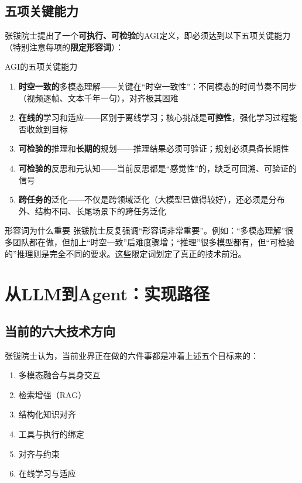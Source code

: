 \documentclass[a4paper]{article}
\begin{document}
\subsection{五项关键能力}

张钹院士提出了一个\textbf{可执行、可检验}的AGI定义，即必须达到以下五项关键能力（特别注意每项的\textbf{限定形容词}）：

\begin{importantbox}{AGI的五项关键能力}
\begin{enumerate}
\item \textbf{时空一致的}多模态理解——关键在``时空一致性''：不同模态的时间节奏不同步（视频逐帧、文本千年一句），对齐极其困难
\item \textbf{在线的}学习和适应——区别于离线学习；核心挑战是\textbf{可控性}，强化学习过程能否收敛到目标
\item \textbf{可检验的}推理和\textbf{长期的}规划——推理结果必须可验证；规划必须具备长期性
\item \textbf{可检验的}反思和元认知——当前反思都是``感觉性''的，缺乏可回溯、可验证的信号
\item \textbf{跨任务的}泛化——不仅是跨领域泛化（大模型已做得较好），还必须是分布外、结构不同、长尾场景下的跨任务泛化
\end{enumerate}
\end{importantbox}

\begin{knowledgebox}{形容词为什么重要}
张钹院士反复强调``形容词非常重要''。例如：``多模态理解''很多团队都在做，但加上``时空一致''后难度骤增；``推理''很多模型都有，但``可检验的''推理则是完全不同的要求。这些限定词划定了真正的技术前沿。
\end{knowledgebox}


\section{从LLM到Agent：实现路径}

\subsection{当前的六大技术方向}

张钹院士认为，当前业界正在做的六件事都是冲着上述五个目标来的：

\begin{enumerate}
\item 多模态融合与具身交互
\item 检索增强（RAG）
\item 结构化知识对齐
\item 工具与执行的绑定
\item 对齐与约束
\item 在线学习与适应
\end{enumerate}
\end{document}
